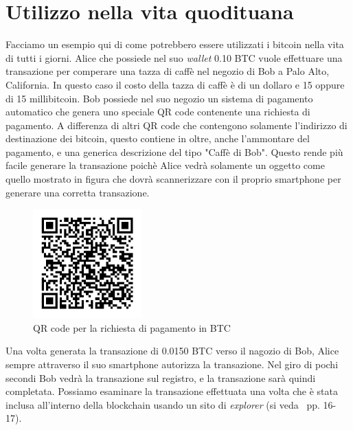  	

\section{Utilizzo nella vita quodituana}
Facciamo un esempio qui di come potrebbero essere utilizzati i bitcoin nella vita di tutti i giorni. Alice che possiede nel suo \textit{wallet} 0.10 BTC vuole effettuare una transazione per comperare una tazza di caff\`e nel negozio di Bob a Palo Alto, California. In questo caso il costo della tazza di caff\`e \`e di un dollaro e 15 oppure di 15 millibitcoin. Bob possiede nel suo negozio un sistema di pagamento automatico che genera uno speciale QR code contenente una richiesta di pagamento. A differenza di altri QR code che contengono solamente l'indirizzo di destinazione dei bitcoin, questo contiene in oltre, anche l'ammontare del pagamento, e una generica descrizione del tipo "Caff\`e di Bob". Questo rende pi\`u facile generare la transazione poich\`e Alice vedr\`a solamente un oggetto come quello mostrato in figura che dovr\`a scannerizzare con il proprio smartphone per generare una corretta transazione.
\begin{figure}[!h]
   \includegraphics[width=0.375\textwidth]{imgs/QRcode.png}
   \caption{QR code per la richiesta di pagamento in BTC}
\end{figure}
Una volta generata la transazione di 0.0150 BTC verso il nagozio di Bob, Alice sempre attraverso il suo smartphone autorizza la transazione. Nel giro di pochi secondi Bob vedr\`a la transazione sul registro, e la transazione sar\`a quindi completata.
Possiamo esaminare la transazione effettuata una volta che \`e stata inclusa all'interno della blockchain usando un sito di \textit{explorer} (si veda~\cite{antonopoulos2017mastering} pp. 16-17).



